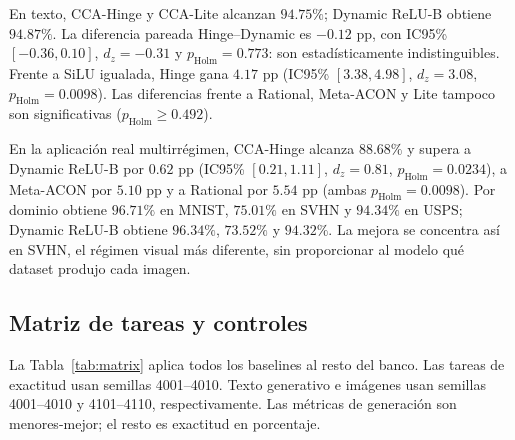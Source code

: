 \documentclass[runningheads]{llncs}
\begin{document}
En texto, CCA-Hinge y CCA-Lite alcanzan $94.75\%$; Dynamic ReLU-B obtiene $94.87\%$. La diferencia pareada Hinge--Dynamic es $-0.12$ pp, con IC95\% $[-0.36,0.10]$, $d_z=-0.31$ y $p_{\mathrm{Holm}}=0.773$: son estadísticamente indistinguibles. Frente a SiLU igualada, Hinge gana $4.17$ pp (IC95\% $[3.38,4.98]$, $d_z=3.08$, $p_{\mathrm{Holm}}=0.0098$). Las diferencias frente a Rational, Meta-ACON y Lite tampoco son significativas ($p_{\mathrm{Holm}}\geq0.492$).

En la aplicación real multirrégimen, CCA-Hinge alcanza $88.68\%$ y supera a Dynamic ReLU-B por $0.62$ pp (IC95\% $[0.21,1.11]$, $d_z=0.81$, $p_{\mathrm{Holm}}=0.0234$), a Meta-ACON por $5.10$ pp y a Rational por $5.54$ pp (ambas $p_{\mathrm{Holm}}=0.0098$). Por dominio obtiene $96.71\%$ en MNIST, $75.01\%$ en SVHN y $94.34\%$ en USPS; Dynamic ReLU-B obtiene $96.34\%$, $73.52\%$ y $94.32\%$. La mejora se concentra así en SVHN, el régimen visual más diferente, sin proporcionar al modelo qué dataset produjo cada imagen.

\subsection{Matriz de tareas y controles}
La Tabla~\ref{tab:matrix} aplica todos los baselines al resto del banco. Las tareas de exactitud usan semillas 4001--4010. Texto generativo e imágenes usan semillas 4001--4010 y 4101--4110, respectivamente. Las métricas de generación son menores-mejor; el resto es exactitud en porcentaje.
\end{document}
